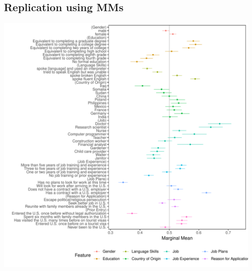 \documentclass[a4paper,12pt]{article}\usepackage[]{graphicx}\usepackage[]{color}
\makeatletter
\def\maxwidth{ %
  \ifdim\Gin@nat@width>\linewidth
    \linewidth
  \else
    \Gin@nat@width
  \fi
}
\newenvironment{knitrout}{}{} %
\makeatother
\begin{document}
\clearpage

\subsection{Replication using MMs}

\begin{knitrout}
\color{fgcolor}
\includegraphics[width=\maxwidth]{figure/hainmueller_immigration_mm_appendix-1} 

\end{knitrout}

\clearpage
\end{document}
